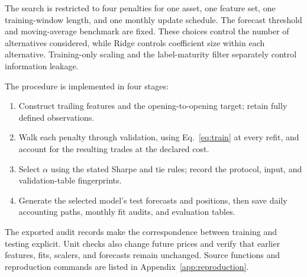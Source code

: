 The search is restricted to four penalties for one asset, one feature set, one training-window length, and one monthly update schedule. The forecast threshold and moving-average benchmark are fixed. These choices control the number of alternatives considered, while Ridge controls coefficient size within each alternative. Training-only scaling and the label-maturity filter separately control information leakage.

The procedure is implemented in four stages:
\begin{enumerate}
\item Construct trailing features and the opening-to-opening target; retain fully defined observations.
\item Walk each penalty through validation, using Eq.~\eqref{eq:train} at every refit, and account for the resulting trades at the declared cost.
\item Select $\alpha$ using the stated Sharpe and tie rules; record the protocol, input, and validation-table fingerprints.
\item Generate the selected model's test forecasts and positions, then save daily accounting paths, monthly fit audits, and evaluation tables.
\end{enumerate}
The exported audit records make the correspondence between training and testing explicit. Unit checks also change future prices and verify that earlier features, fits, scalers, and forecasts remain unchanged. Source functions and reproduction commands are listed in Appendix~\ref{app:reproduction}.
